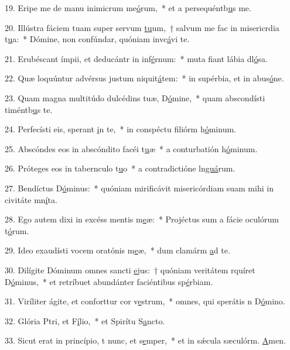 19. Eripe me de manu inimicrum me\uline{ó}rum,~* et a persequéntb\uline{u}s me.\par 
20. Illústra fáciem tuam super servum \uline{tu}um,~† salvum me fac in misericrdia t\uline{u}a:~* Dómine, non confúndar, quóniam invc\uline{á}vi te.\par 
21. Erubéscant ímpii, et deducántr in inf\uline{é}rnum:~* muta fiant lábia dl\uline{ó}sa.\par 
22. Quæ loquúntur advérsus justum niquit\uline{á}tem:~* in supérbia, et in abus\uline{ó}ne.\par 
23. Quam magna multitúdo dulcédins tuæ, D\uline{ó}mine,~* quam abscondísti timéntb\uline{u}s te.\par 
24. Perfecísti eis,  sperant \uline{i}n te,~* in conspéctu filiórm h\uline{ó}minum.\par 
25. Abscóndes eos in abscóndito facéi t\uline{u}æ~* a conturbatión h\uline{ó}minum.\par 
26. Próteges eos in tabernculo t\uline{u}o~* a contradictióne ln\uline{guá}rum.\par 
27. Bendíctus D\uline{ó}minus:~* quóniam mirificávit misericórdiam suam mihi in civitáte mn\uline{í}ta.\par 
28. Ego autem dixi in excéss mentis m\uline{e}æ:~* Projéctus sum a fácie oculórum t\uline{ó}rum.\par 
29. Ideo exaudísti vocem oratónis m\uline{e}æ,~* dum clamárm \uline{a}d te.\par 
30. Dilígite Dóminum omnes sancti \uline{e}jus:~† quóniam veritátem rquíret D\uline{ó}minus,~* et retríbuet abundánter faciéntibus sp\uline{é}rbiam.\par 
31. Viríliter ágite, et conforttur cor v\uline{e}strum,~* omnes, qui sperátis n D\uline{ó}mino.\par 
32. Glória Ptri, et F\uline{í}lio,~* et Spirítu S\uline{a}ncto.\par 
33. Sicut erat in princípio, t nunc, et s\uline{e}mper,~* et in sǽcula sæculórm. \uline{A}men.\par 
